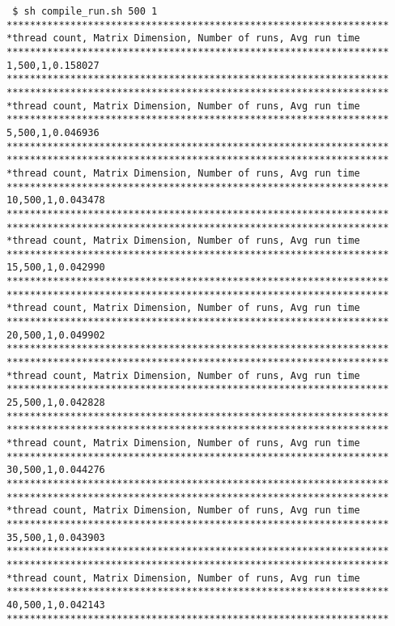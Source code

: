 \documentclass[a4paper]{article}
\begin{document}
\begin{verbatim}
 $ sh compile_run.sh 500 1
******************************************************************
*thread count, Matrix Dimension, Number of runs, Avg run time
******************************************************************
1,500,1,0.158027
******************************************************************
******************************************************************
*thread count, Matrix Dimension, Number of runs, Avg run time
******************************************************************
5,500,1,0.046936
******************************************************************
******************************************************************
*thread count, Matrix Dimension, Number of runs, Avg run time
******************************************************************
10,500,1,0.043478
******************************************************************
******************************************************************
*thread count, Matrix Dimension, Number of runs, Avg run time
******************************************************************
15,500,1,0.042990
******************************************************************
******************************************************************
*thread count, Matrix Dimension, Number of runs, Avg run time
******************************************************************
20,500,1,0.049902
******************************************************************
******************************************************************
*thread count, Matrix Dimension, Number of runs, Avg run time
******************************************************************
25,500,1,0.042828
******************************************************************
******************************************************************
*thread count, Matrix Dimension, Number of runs, Avg run time
******************************************************************
30,500,1,0.044276
******************************************************************
******************************************************************
*thread count, Matrix Dimension, Number of runs, Avg run time
******************************************************************
35,500,1,0.043903
******************************************************************
******************************************************************
*thread count, Matrix Dimension, Number of runs, Avg run time
******************************************************************
40,500,1,0.042143
******************************************************************

\end{verbatim}
\end{document}

